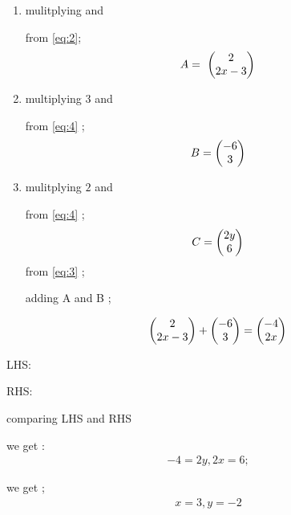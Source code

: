 \documentclass[journal,12pt,twocolumn]{IEEEtran}
\begin{document}
       \begin{enumerate} [label=(\roman*)]
 \item mulitplying 
        and 
       
       from \eqref{eq:2};
       \begin{align}
        A = \ \begin{pmatrix}2 \\2x-3 \end{pmatrix} 
       \end{align}
 \item multiplying $3$ and
      
       from \eqref{eq:4} ;
      \begin{align}
      B = \begin{pmatrix}-6 \\3 \end{pmatrix} 
      \end{align}
 \item mulitplying 
       $2$ and  
       
       from \eqref{eq:4} ;
      \begin{align}
       C = \begin{pmatrix}2y \\6 \end{pmatrix} 
      \end{align}
       from \eqref{eq:3} ; 
      
       adding A and B ;
       
       \begin{align}
       \begin{pmatrix}2\\2x-3 \end{pmatrix} + \begin{pmatrix}-6\\3\end{pmatrix} = 
       \begin{pmatrix}-4\\2x\end{pmatrix} 
       \end{align}
       \end{enumerate} 

{LHS}: 
      
{RHS}:              
      
       comparing {LHS} and {RHS}
      
       we get :
      \begin{align}
        -4 = 2y , 2x = 6 ;
      \end{align}
       
       we get ;
      \begin{align}
       x = 3 , y = -2
      \end{align}
      
\end{document}
